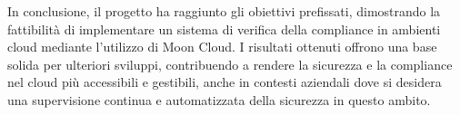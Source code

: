 In conclusione, il progetto ha raggiunto gli obiettivi prefissati, dimostrando la fattibilità di implementare un sistema di verifica della compliance in ambienti cloud mediante l'utilizzo di Moon Cloud. I risultati ottenuti offrono una base solida per ulteriori sviluppi, contribuendo a rendere la sicurezza e la compliance nel cloud più accessibili e gestibili, anche in contesti aziendali dove si desidera una supervisione continua e automatizzata della sicurezza in questo ambito.
